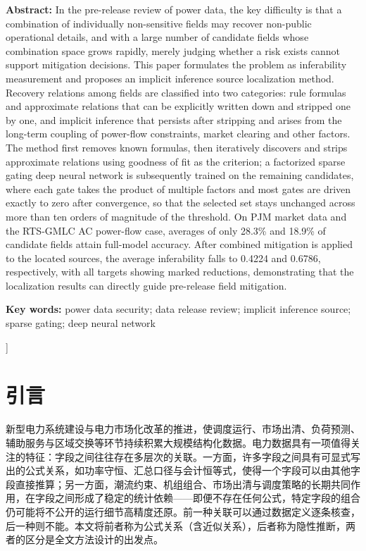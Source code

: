 \documentclass[UTF8,zihao=5,twoside,fontset=none]{ctexart}
\begin{document}
\noindent\textbf{Abstract:} In the pre-release review of power data, the key difficulty is that a combination of individually non-sensitive fields may recover non-public operational details, and with a large number of candidate fields whose combination space grows rapidly, merely judging whether a risk exists cannot support mitigation decisions. This paper formulates the problem as inferability measurement and proposes an implicit inference source localization method. Recovery relations among fields are classified into two categories: rule formulas and approximate relations that can be explicitly written down and stripped one by one, and implicit inference that persists after stripping and arises from the long-term coupling of power-flow constraints, market clearing and other factors. The method first removes known formulas, then iteratively discovers and strips approximate relations using goodness of fit as the criterion; a factorized sparse gating deep neural network is subsequently trained on the remaining candidates, where each gate takes the product of multiple factors and most gates are driven exactly to zero after convergence, so that the selected set stays unchanged across more than ten orders of magnitude of the threshold. On PJM market data and the RTS-GMLC AC power-flow case, averages of only 28.3\% and 18.9\% of candidate fields attain full-model accuracy. After combined mitigation is applied to the located sources, the average inferability falls to 0.4224 and 0.6786, respectively, with all targets showing marked reductions, demonstrating that the localization results can directly guide pre-release field mitigation.\par
\noindent\textbf{Key words:} power data security; data release review; implicit inference source; sparse gating; deep neural network\par\vspace{0.8em}
]

\section{引言}

新型电力系统建设与电力市场化改革的推进，使调度运行、市场出清、负荷预测、辅助服务与区域交换等环节持续积累大规模结构化数据\cite{ref-liu-cps}。电力数据具有一项值得关注的特征：字段之间往往存在多层次的关联。一方面，许多字段之间具有可显式写出的公式关系，如功率守恒、汇总口径与会计恒等式，使得一个字段可以由其他字段直接推算；另一方面，潮流约束、机组组合、市场出清与调度策略的长期共同作用，在字段之间形成了稳定的统计依赖——即便不存在任何公式，特定字段的组合仍可能将不公开的运行细节高精度还原。前一种关联可以通过数据定义逐条核查，后一种则不能。本文将前者称为公式关系（含近似关系），后者称为隐性推断，两者的区分是全文方法设计的出发点。
\end{document}
